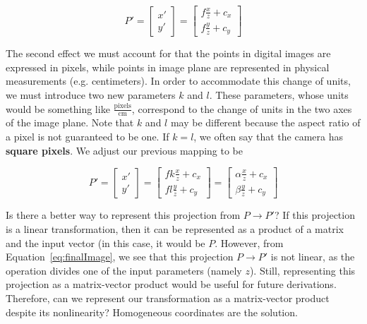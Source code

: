 \documentclass[a4paper, 12pt]{article}
\renewcommand\emph{\textbf}
\begin{document}
\begin{equation}
    P' = \begin{bmatrix}x'\\y'\end{bmatrix} = \begin{bmatrix}f\frac{x}{z}+c_x \\ f\frac{y}{z}+c_y\end{bmatrix}
\end{equation}

The second effect we must account for that the points in digital images are expressed in pixels, while points in image plane are represented in physical measurements (e.g. centimeters). In order to accommodate this change of units, we must introduce two new parameters $k$ and $l$. These parameters, whose units would be something like $\frac{\mathrm{pixels}}{\mathrm{cm}}$, correspond to the change of units in the two axes of the image plane. Note that $k$ and $l$ may be different because the aspect ratio of a pixel is not guaranteed to be one. If $k=l$, we often say that the camera has \emph{square pixels}. We adjust our previous mapping to be

\begin{equation}
    P' = \begin{bmatrix}x'\\y'\end{bmatrix} = \begin{bmatrix}fk\frac{x}{z}+c_x \\ fl\frac{y}{z}+c_y\end{bmatrix} = \begin{bmatrix}\alpha\frac{x}{z}+c_x \\ \beta\frac{y}{z}+c_y\end{bmatrix}
    \label{eq:finalImage}
\end{equation}

Is there a better way to represent this projection from $P\rightarrow P'$? If this projection is a linear transformation, then it can be represented as a product of a matrix and the input vector (in this case, it would be $P$. However, from Equation~\ref{eq:finalImage}, we see that this projection $P\rightarrow P'$ is not linear, as the operation divides one of the input parameters (namely $z$). Still, representing this projection as a matrix-vector product would be useful for future derivations. Therefore, can we represent our transformation as a matrix-vector product despite its nonlinearity? Homogeneous coordinates are the solution.
\end{document}
